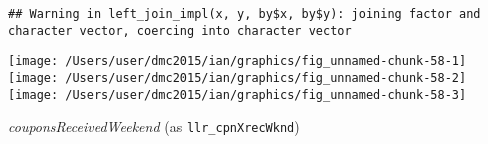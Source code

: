 \documentclass[10pt]{report}
\newenvironment{Shaded}{}{}
\newcommand{\KeywordTok}[1]{\textcolor[rgb]{0.00,0.44,0.13}{\textbf{{#1}}}}
\newcommand{\DataTypeTok}[1]{\textcolor[rgb]{0.56,0.13,0.00}{{#1}}}
\newcommand{\StringTok}[1]{\textcolor[rgb]{0.25,0.44,0.63}{{#1}}}
\newcommand{\NormalTok}[1]{{#1}}
\begin{document}
\begin{Shaded}
\end{Shaded}

\begin{verbatim}
## Warning in left_join_impl(x, y, by$x, by$y): joining factor and character vector, coercing into character vector
\end{verbatim}

\begin{Shaded}
\end{Shaded}

\begin{center}\texttt{[image: /Users/user/dmc2015/ian/graphics/fig\_unnamed-chunk-58-1]} \texttt{[image: /Users/user/dmc2015/ian/graphics/fig\_unnamed-chunk-58-2]} \texttt{[image: /Users/user/dmc2015/ian/graphics/fig\_unnamed-chunk-58-3]} \end{center}

\emph{couponsReceivedWeekend} (as \texttt{llr\_cpnXrecWknd})
\end{document}
